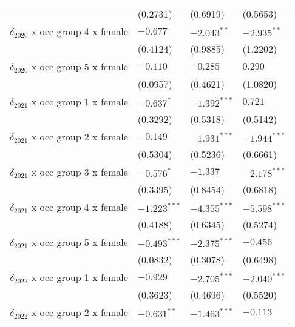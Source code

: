 \begin{tabular}{llll}
                                       &           (0.2731) &           (0.6919) &           (0.5653) \\
$\delta_{2020}$ x occ group 4 x female &           $-0.677$ &      $-2.043^{**}$ &      $-2.935^{**}$ \\
                                       &           (0.4124) &           (0.9885) &           (1.2202) \\
$\delta_{2020}$ x occ group 5 x female &           $-0.110$ &           $-0.285$ &            $0.290$ \\
                                       &           (0.0957) &           (0.4621) &           (1.0820) \\
$\delta_{2021}$ x occ group 1 x female &         $-0.637^*$ &     $-1.392^{***}$ &            $0.721$ \\
                                       &           (0.3292) &           (0.5318) &           (0.5142) \\
$\delta_{2021}$ x occ group 2 x female &           $-0.149$ &     $-1.931^{***}$ &     $-1.944^{***}$ \\
                                       &           (0.5304) &           (0.5236) &           (0.6661) \\
$\delta_{2021}$ x occ group 3 x female &         $-0.576^*$ &           $-1.337$ &     $-2.178^{***}$ \\
                                       &           (0.3395) &           (0.8454) &           (0.6818) \\
$\delta_{2021}$ x occ group 4 x female &     $-1.223^{***}$ &     $-4.355^{***}$ &     $-5.598^{***}$ \\
                                       &           (0.4188) &           (0.6345) &           (0.5274) \\
$\delta_{2021}$ x occ group 5 x female &     $-0.493^{***}$ &     $-2.375^{***}$ &           $-0.456$ \\
                                       &           (0.0832) &           (0.3078) &           (0.6498) \\
$\delta_{2022}$ x occ group 1 x female &           $-0.929$ &     $-2.705^{***}$ &     $-2.040^{***}$ \\
                                       &           (0.3623) &           (0.4696) &           (0.5520) \\
$\delta_{2022}$ x occ group 2 x female &      $-0.631^{**}$ &     $-1.463^{***}$ &           $-0.113$ \\

\end{tabular}
